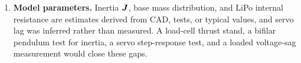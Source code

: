 \begin{enumerate}[label=(\roman*)]
  \item \textbf{Model parameters.} Inertia $\bm{J}$, base mass distribution, and LiPo internal resistance are estimates derived from CAD, tests, or typical values, and servo lag was inferred rather than measured. A load-cell thrust stand, a bifilar pendulum test for inertia, a servo step-response test, and a loaded voltage-sag measurement would close these gaps.
\end{enumerate}
